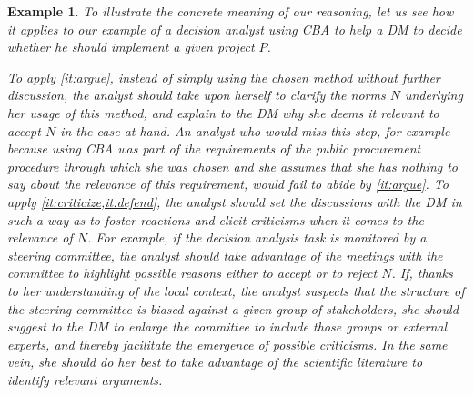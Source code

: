 \documentclass[preprint, french, english, 11pt, authoryear]{elsarticle}%
\newtheorem{example}{Example}
\begin{document}
\begin{example}
To illustrate the concrete meaning of our reasoning, let us see how it applies to our example of a decision analyst using \ac{CBA}
 to help a \ac{DM}
  to decide whether he should implement a given project $P$.

To apply \cref{it:argue}, instead of simply using the chosen method without further discussion, the analyst should take upon herself to clarify the norms $N$ underlying her usage of this method, and explain to the \ac{DM}
 why she deems it relevant to accept $N$ in the case at hand.
An analyst who would miss this step, for example because using \ac{CBA}
 was part of the requirements of the public procurement procedure through which she was chosen and she assumes that she has nothing to say about the relevance of this requirement, would fail to abide by \cref{it:argue}.
To apply \cref{it:criticize,it:defend}, the analyst should set the discussions with the \ac{DM}
 in such a way as to foster reactions and elicit criticisms when it comes to the relevance of $N$.
For example, if the decision analysis task is monitored by a steering committee, the analyst should take advantage of the meetings with the committee to highlight possible reasons either to accept or to reject $N$.
If, thanks to her understanding of the local context, the analyst suspects that the structure of the steering committee is biased against a given group of stakeholders, she should suggest to the \ac{DM}
 to enlarge the committee to include those groups or external experts, 
and thereby facilitate the emergence of possible criticisms.
In the same vein, she should do her best to take advantage of the scientific literature to identify relevant arguments.  




\end{example}
\end{document}
